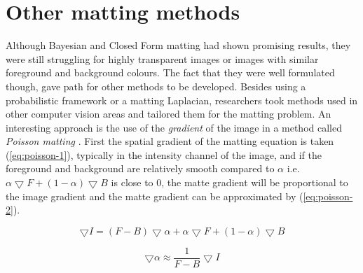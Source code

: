 \section{Other matting methods}
\label{sec:other-matting-methods}

Although Bayesian and Closed Form matting had shown promising results, they were still struggling for highly transparent images or images with similar foreground and background colours. The fact that they were well formulated though, gave path for other methods to be developed. Besides using a probabilistic framework or a matting Laplacian, researchers took methods used in other computer vision areas and tailored them for the matting problem. 
An interesting approach is the use of the \textit{gradient} of the image in a method called \textit{Poisson matting} \cite{poisson}. First the spatial gradient of the matting equation is taken (\ref{eq:poisson-1}), typically in the intensity channel of the image, and if the foreground and background are relatively smooth compared to $\alpha$ i.e. $\alpha\bigtriangledown F+(1-\alpha)\bigtriangledown B$ is close to 0, the matte gradient will be proportional to the image gradient and the matte gradient can be approximated by (\ref{eq:poisson-2}). 

\begin{equation} \label{eq:poisson-1}
\bigtriangledown I=(F-B)\bigtriangledown \alpha+\alpha\bigtriangledown F+(1-\alpha)\bigtriangledown B
\end{equation}

\begin{equation} \label{eq:poisson-2}
\bigtriangledown \alpha\approx \frac{1}{F-B}\bigtriangledown I
\end{equation}

